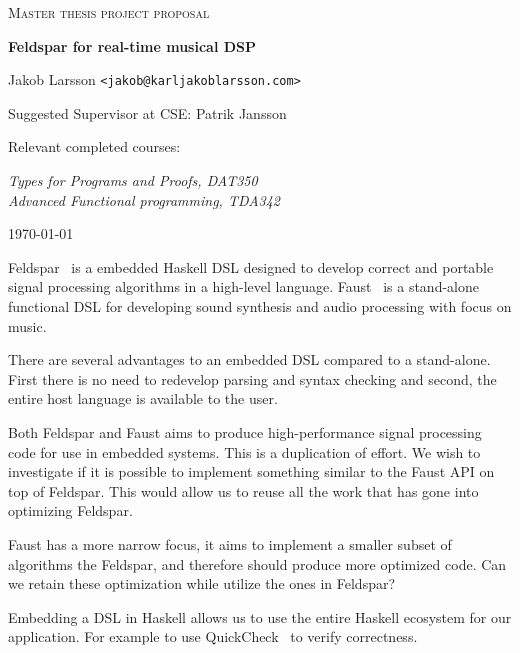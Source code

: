 \documentclass{scrartcl}
\begin{document}
\begin{titlepage}

\centering
{\scshape\LARGE Master thesis project proposal}

\vspace{0.5cm}
{\huge\bfseries Feldspar for real-time musical DSP
  }

\vspace{2cm}
{\Large Jakob Larsson \texttt{<jakob@karljakoblarsson.com>}}

\vspace{1.0cm}
{\large Suggested Supervisor at CSE: Patrik Jansson }

\vspace{1.5cm}
{\large Relevant completed courses:}

{\itshape
Types for Programs and Proofs, DAT350 \\
Advanced Functional programming, TDA342 \\
}

\vfill
{\large \today}

\end{titlepage}




Feldspar~\cite{feldspar} is a embedded Haskell DSL designed to develop correct
and portable signal processing algorithms in a high-level language.
Faust~\cite{faust} is a stand-alone functional DSL for developing sound
synthesis and audio processing with focus on music.

There are several advantages to an embedded DSL compared to a stand-alone.
First there is no need to redevelop parsing and syntax checking and second, the
entire host language is available to the user.

Both Feldspar and Faust aims to produce high-performance signal processing code
for use in embedded systems. This is a duplication of effort. We wish to
investigate if it is possible to implement something similar to the Faust API
on top of Feldspar. This would allow us to reuse all the work that has gone
into optimizing Feldspar.

Faust has a more narrow focus, it aims to implement a smaller subset of
algorithms the Feldspar, and therefore should produce more optimized code. Can
we retain these optimization while utilize the ones in Feldspar?

Embedding a DSL in Haskell allows us to use the entire Haskell ecosystem for
our application. For example to use QuickCheck~\cite{claessen_quickcheck_2000}
to verify correctness.




\end{document}
